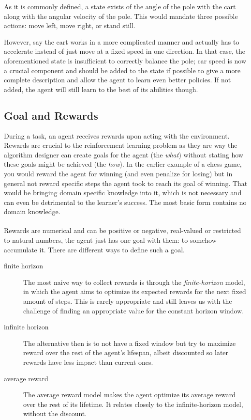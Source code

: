 As it is commonly defined,
a state exists of the angle of the pole with the cart
along with the angular velocity of the pole.
This would mandate three possible actions:
move left, move right, or stand still.

However, say the cart works in a more complicated manner
and actually has to accelerate instead of just
move at a fixed speed in one direction.
In that case,
the aforementioned state is insufficient
to correctly balance the pole;
car speed is now a crucial component
and should be added to the state if possible
to give a more complete description
and allow the agent to learn even better policies.
If not added, the agent will still learn
to the best of its abilities though.


\subsection{Goal and Rewards}
During a task,
an agent receives rewards upon acting with the environment.
Rewards are crucial to the reinforcement learning problem
as they are way the algorithm designer
can create goals for the agent (the \textit{what})
without stating how these goals might be achieved (the \textit{how}).
In the earlier example of a chess game,
you would reward the agent for winning
(and even penalize for losing)
but in general not reward specific steps the agent took
to reach its goal of winning.
That would be bringing domain specific knowledge into it,
which is not necessary and can
even be detrimental to the learner's success.
The most basic form contains no domain knowledge.


\paragraph{}
Rewards are numerical and can be positive or negative,
real-valued or restricted to natural numbers,
the agent just has one goal with them:
to somehow accumulate it.
There are different ways to define such a goal.

\begin{description}
  \item[finite horizon]
    The most naive way to collect rewards is through the
    \textit{finite-horizon} model,
    in which the agent aims to optimize its expected
    rewards for the next fixed amount of steps.
    This is rarely appropriate and still leaves us
    with the challenge of finding an appropriate value
    for the constant horizon window.
  \item[infinite horizon]
    The alternative then is to not have a fixed window
    but try to maximize reward over the rest of the agent's lifespan,
    albeit discounted so later rewards have less impact than current ones.
  \item[average reward]
    The average reward model makes the agent optimize
    its average reward over the rest of its lifetime.
    It relates closely to the infinite-horizon model, without the discount.
\end{description}

